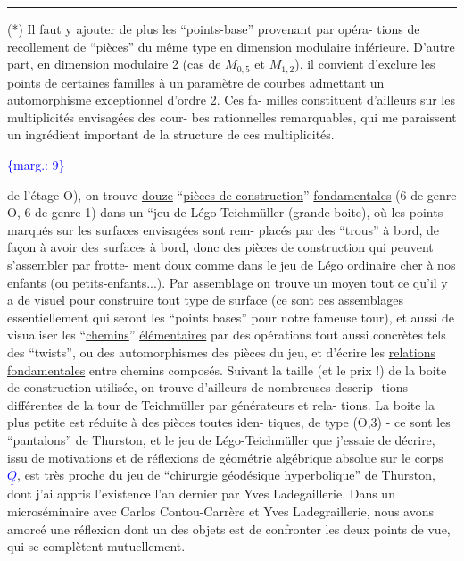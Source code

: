 \documentclass[11pt]{article}
\newcommand{\scanpage}[1]{\par\bigskip\noindent{\small\sffamily[scan #1]}\par}
\newcommand{\mspage}[1]{{\small\sffamily[p.\,#1]}}
\newcommand{\hand}[1]{\textcolor{blue}{#1}}
\newcommand{\margin}[1]{\textcolor{blue}{\{\textsf{marg.:} #1\}}}
\newcommand{\uline}[1]{\underline{#1}}
\begin{document}
\rule{4cm}{0.4pt}

(*) Il faut y ajouter de plus les ``points-base'' provenant par opéra-%
tions de recollement de ``pièces'' du même type en dimension modulaire
inférieure. D'autre part, en dimension modulaire 2 (cas de $M_{0,5}$ et $M_{1,2}$),
il convient d'exclure les points de certaines familles à un paramètre
de courbes admettant un automorphisme exceptionnel d'ordre 2. Ces fa-%
milles constituent d'ailleurs sur les multiplicités envisagées des cour-%
bes rationnelles remarquables, qui me paraissent un ingrédient important
de la structure de ces multiplicités.

\margin{9}

\clearpage
\scanpage{119/10}
\mspage{8}

de l'étage O), on trouve \uline{douze} ``\uline{pièces de construction}'' \uline{fondamentales}
(6 de genre O, 6 de genre 1) dans un ``jeu de Légo-Teichmüller (grande
boite), où les points marqués sur les surfaces envisagées sont rem-%
placés par des ``trous'' à bord, de façon à avoir des surfaces à bord,
donc des pièces de construction qui peuvent s'assembler par frotte-%
ment doux comme dans le jeu de Légo ordinaire cher à nos enfants
(ou petits-enfants...). Par assemblage on trouve un moyen tout ce
qu'il y a de visuel pour construire tout type de surface (ce sont
ces assemblages essentiellement qui seront les ``points bases'' pour
notre fameuse tour), et aussi de visualiser les ``\uline{chemins}'' \uline{élémentaires}
par des opérations tout aussi concrètes tels des ``twists'', ou des
automorphismes des pièces du jeu, et d'écrire les \uline{relations fondamentales}
entre chemins composés. Suivant la taille (et le prix !) de la boite
de construction utilisée, on trouve d'ailleurs de nombreuses descrip-%
tions différentes de la tour de Teichmüller par générateurs et rela-%
tions. La boite la plus petite est réduite à des pièces toutes iden-%
tiques, de type (O,3) - ce sont les ``pantalons'' de Thurston, et le
jeu de Légo-Teichmüller que j'essaie de décrire, issu de motivations
et de réflexions de géométrie algébrique absolue sur le corps \hand{$\underline{Q}$},
est très proche du jeu de ``chirurgie géodésique hyperbolique'' de
Thurston, dont j'ai appris l'existence l'an dernier par Yves Ladegaillerie.
Dans un microséminaire avec Carlos Contou-Carrère et Yves Ladegraillerie,
nous avons amorcé une réflexion dont un des objets est de confronter
les deux points de vue, qui se complètent mutuellement.
\end{document}
